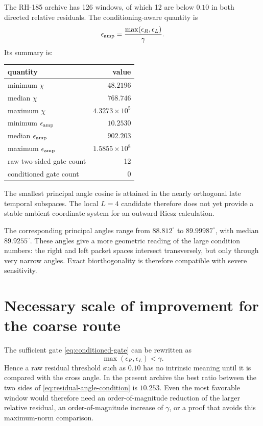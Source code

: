 \documentclass[12pt]{article}
\theoremstyle{remark}
\begin{document}
The RH-185 archive has 126 windows, of which 12 are below $0.10$ in both
directed relative residuals.  The conditioning-aware quantity is
\begin{equation}\label{eq:amplified}
 \epsilon_{\rm amp}
 =\frac{\max(\epsilon_R,\epsilon_L)}{\gamma}.
\end{equation}
Its summary is:
\begin{center}
\begin{tabular}{lr}
\toprule
quantity & value\\
\midrule
minimum $\chi$ & $48.2196$\\
median $\chi$ & $768.746$\\
maximum $\chi$ & $4.3273\times10^5$\\
minimum $\epsilon_{\rm amp}$ & $10.2530$\\
median $\epsilon_{\rm amp}$ & $902.203$\\
maximum $\epsilon_{\rm amp}$ & $1.5855\times10^8$\\
raw two-sided gate count & 12\\
conditioned gate count & 0\\
\bottomrule
\end{tabular}
\end{center}

The smallest principal angle cosine is attained in the nearly orthogonal
late temporal subspaces.  The local $L=4$ candidate therefore does not yet
provide a stable ambient coordinate system for an outward Riesz calculation.

The corresponding principal angles range from $88.812^\circ$ to
$89.99987^\circ$, with median $89.9255^\circ$.  These angles give a more
geometric reading of the large condition numbers: the right and left packet
spaces intersect transversely, but only through very narrow angles.  Exact
biorthogonality is therefore compatible with severe sensitivity.

\section{Necessary scale of improvement for the coarse route}

The sufficient gate \eqref{eq:conditioned-gate} can be rewritten as
\begin{equation}\label{eq:residual-angle-condition}
 \max(\epsilon_R,\epsilon_L)<\gamma.
\end{equation}
Hence a raw residual threshold such as $0.10$ has no intrinsic meaning until
it is compared with the cross angle.  In the present archive the best ratio
between the two sides of \eqref{eq:residual-angle-condition} is $10.253$.
Even the most favorable window would therefore need an order-of-magnitude
reduction of the larger relative residual, an order-of-magnitude increase
of $\gamma$, or a proof that avoids this maximum-norm comparison.
\end{document}
